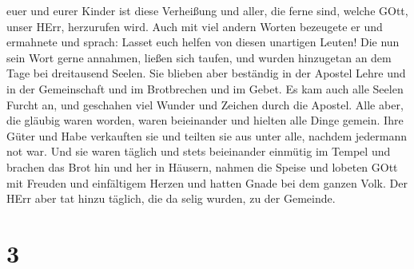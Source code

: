 euer und eurer Kinder ist diese Verheißung und aller, die ferne sind,
welche GOtt, unser HErr, herzurufen wird.  Auch mit viel
andern Worten bezeugete er und ermahnete und sprach: Lasset euch helfen
von diesen unartigen Leuten!  Die nun sein Wort gerne
annahmen, ließen sich taufen, und wurden hinzugetan an dem Tage bei
dreitausend Seelen.  Sie blieben aber beständig in der
Apostel Lehre und in der Gemeinschaft und im Brotbrechen und im Gebet.
 Es kam auch alle Seelen Furcht an, und geschahen viel
Wunder und Zeichen durch die Apostel.  Alle aber, die
gläubig waren worden, waren beieinander und hielten alle Dinge gemein.
 Ihre Güter und Habe verkauften sie und teilten sie aus
unter alle, nachdem jedermann not war.  Und sie waren
täglich und stets beieinander einmütig im Tempel und brachen das Brot
hin und her in Häusern,  nahmen die Speise und lobeten GOtt
mit Freuden und einfältigem Herzen und hatten Gnade bei dem ganzen Volk.
Der HErr aber tat hinzu täglich, die da selig wurden, zu der Gemeinde.

\hypertarget{section-2}{%
\section{3}\label{section-2}}

